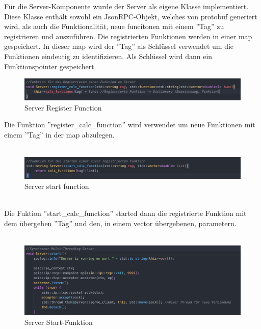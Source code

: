\documentclass[german,oneside,color]{htldipl}
\begin{document}
Für die Server-Komponente wurde der Server als eigene Klasse implementiert. Diese Klasse enthält sowohl ein JsonRPC-Objekt, welches von protobuf generiert wird, als auch die Funktionalität, neue funcitonen mit einem ''Tag'' zu registrieren und auszuführen.
\newpage
Die registrierten Funktionen werden in einer map gespeichert. In dieser map wird der ''Tag'' als Schlüssel verwendet um die Funktionen eindeutig zu identifizieren. Als Schlüssel wird dann ein Funktionspointer gespeichert. 
\begin{figure}[h!]
  \centering
  \includegraphics[width=1\textwidth]{images/Server_register.png}
  \caption{Server Register Function}
  \label{Server_register}
\end{figure}    
Die Funktion ''register\_calc\_function'' wird verwendet um neue Funktionen mit einem ''Tag'' in der map abzulegen. 
\\
\\
\begin{figure}[h!]
  \centering
  \includegraphics[width=1\textwidth]{images/Server_start_registered.png}
  \caption{Server start function}
  \label{Server_start_registered}
\end{figure}    
\\
Die Fuktion ''start\_calc\_function'' started dann die registrierte Funktion mit dem übergeben ''Tag'' und den, in einem vector übergebenen, parametern.
\\
\\
\begin{figure}[h!]
  \centering
  \includegraphics[width=1\textwidth]{images/Server_start.png}
  \caption{Server Start-Funktion}
  \label{Server_start}
\end{figure}    
\\
\end{document}
